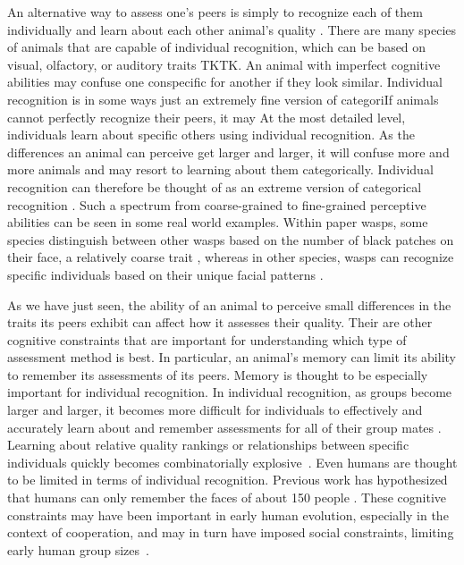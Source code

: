 An alternative way to assess one's peers is simply to recognize each of them individually and learn about each other animal's quality \citep{sheehan2016evotradeoff}. There are many species of animals that are capable of individual recognition, which can be based on visual, olfactory, or auditory traits TKTK. An animal with imperfect cognitive abilities may confuse one conspecific for another if they look similar. Individual recognition is in some ways just an extremely fine version of categoriIf animals cannot perfectly recognize their peers, it may  At the most detailed level, individuals learn about specific others using individual recognition. As the differences an animal can perceive get larger and larger, it will confuse more and more animals and may resort to learning about them categorically. Individual recognition can therefore be thought of as an extreme version of categorical recognition \citep{Barnard:1979fk}. Such a spectrum from coarse-grained to fine-grained perceptive abilities can be seen in some real world examples. Within paper wasps, some species distinguish between other wasps based on the number of black patches on their face, a relatively coarse trait \citep{Tibbetts:2004kx}, whereas in other species, wasps can recognize specific individuals based on their unique facial patterns \citep{Tibbetts:2002ys}. 

As we have just seen, the ability of an animal to perceive small differences in the traits its peers exhibit can affect how it assesses their quality. Their are other cognitive constraints that are important for understanding which type of assessment method is best. In particular, an animal's memory can limit its ability to remember its assessments of its peers. 
Memory is thought to be especially important for individual recognition. In individual recognition, as groups become larger and larger, it becomes more difficult for individuals to effectively and accurately learn about and remember assessments for all of their group mates \citep{Rohwer:1982fk,Solberg:1997uq}. Learning about relative quality rankings or relationships between specific individuals quickly becomes combinatorially explosive~\citep{Seyfarth2015SocialCognition}. Even humans are thought to be limited in terms of individual recognition. Previous work has hypothesized that humans can only remember the faces of about 150 people \citep{Dunbar:1993zr,Hill:2003ly}. These cognitive constraints may have been important in early human evolution, especially in the context of cooperation, and may in turn have imposed social constraints, limiting early human group sizes~\citep{Dunbar:1992ys,Dunbar:1993zr}. 

